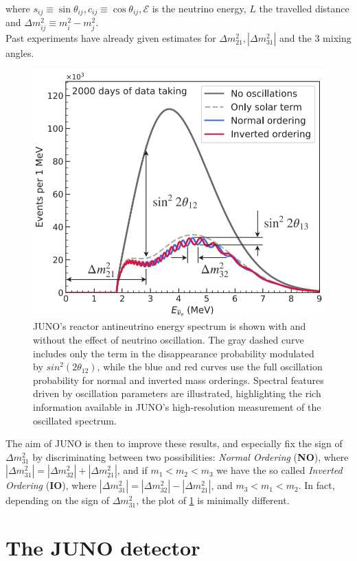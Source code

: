 where $s_{i j} \equiv \sin \theta_{i j}, c_{i j} \equiv \cos \theta_{i j}, \mathcal{E}$ is the neutrino energy, $L$ the travelled distance and $\Delta m_{i j}^2 \equiv m_i^2-m_j^2$. \\
Past experiments have already given estimates for  $\Delta m_{21}^2,\left|\Delta m_{31}^2\right|$ and the  3 mixing angles.


\begin{figure}[h]
	\centering
	\includegraphics[width=0.4\linewidth]{Images/antineutino_to_antineutrino_probability_plot}
	\caption{JUNO's reactor antineutrino energy spectrum is shown with and without the effect of neutrino oscillation. The gray dashed curve includes only the term in the disappearance probability modulated by $sin^2(2\theta_{12})$, while the blue and red curves use the full oscillation probability for normal and inverted mass orderings. Spectral features driven by oscillation parameters are illustrated, highlighting the rich information available in JUNO's high-resolution measurement of the oscillated spectrum.}
	\label{fig:antineutinotoantineutrinoprobabilityplot}
\end{figure}


The aim of JUNO is then to improve these results, and especially fix the sign of $\Delta m_{31}^2$ by discriminating between two possibilities:\textit{ Normal Ordering} (\textbf{NO}), where $\left|\Delta m_{31}^2\right|=\left|\Delta m_{32}^2\right|+\left|\Delta m_{21}^2\right|$, and if $m_1<m_2<m_3$ we have the so called \textit{ Inverted Ordering} (\textbf{IO}), where $\left|\Delta m_{31}^2\right|=\left|\Delta m_{32}^2\right|-\left|\Delta m_{21}^2\right|$, and $m_3<m_1<m_2$.
In fact, depending on the sign of $\Delta m_{31}^2$, the plot of \ref{fig:antineutinotoantineutrinoprobabilityplot} is minimally different.


\section{The JUNO detector}

